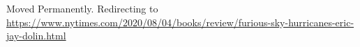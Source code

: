 Moved Permanently. Redirecting to
\url{https://www.nytimes.com/2020/08/04/books/review/furious-sky-hurricanes-eric-jay-dolin.html}
